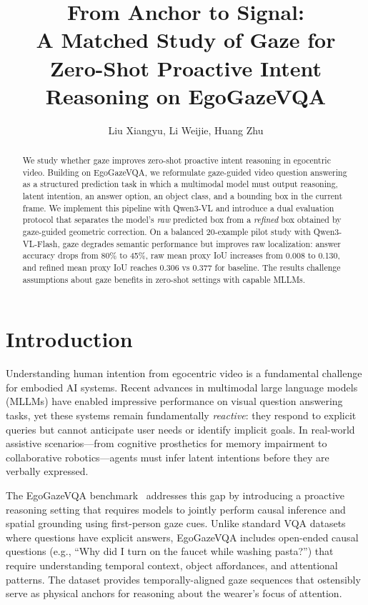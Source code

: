 \documentclass[11pt]{article}
\title{From Anchor to Signal:\\
A Matched Study of Gaze for Zero-Shot Proactive Intent Reasoning on EgoGazeVQA}
\author{Liu Xiangyu, Li Weijie, Huang Zhu}
\begin{document}
\maketitle

\begin{abstract}
We study whether gaze improves zero-shot proactive intent reasoning in egocentric video. Building on EgoGazeVQA, we reformulate gaze-guided video question answering as a structured prediction task in which a multimodal model must output reasoning, latent intention, an answer option, an object class, and a bounding box in the current frame. We implement this pipeline with Qwen3-VL and introduce a dual evaluation protocol that separates the model's \emph{raw} predicted box from a \emph{refined} box obtained by gaze-guided geometric correction. On a balanced 20-example pilot study with Qwen3-VL-Flash, gaze degrades semantic performance but improves raw localization: answer accuracy drops from 80\% to 45\%, raw mean proxy IoU increases from 0.008 to 0.130, and refined mean proxy IoU reaches 0.306 vs 0.377 for baseline. The results challenge assumptions about gaze benefits in zero-shot settings with capable MLLMs.
\end{abstract}

\section{Introduction}
Understanding human intention from egocentric video is a fundamental challenge for embodied AI systems. Recent advances in multimodal large language models (MLLMs) have enabled impressive performance on visual question answering tasks, yet these systems remain fundamentally \emph{reactive}: they respond to explicit queries but cannot anticipate user needs or identify implicit goals. In real-world assistive scenarios---from cognitive prosthetics for memory impairment to collaborative robotics---agents must infer latent intentions before they are verbally expressed.

The EgoGazeVQA benchmark~\cite{peng2025eye} addresses this gap by introducing a proactive reasoning setting that requires models to jointly perform causal inference and spatial grounding using first-person gaze cues. Unlike standard VQA datasets where questions have explicit answers, EgoGazeVQA includes open-ended causal questions (e.g., ``Why did I turn on the faucet while washing pasta?'') that require understanding temporal context, object affordances, and attentional patterns. The dataset provides temporally-aligned gaze sequences that ostensibly serve as physical anchors for reasoning about the wearer's focus of attention.
\end{document}
